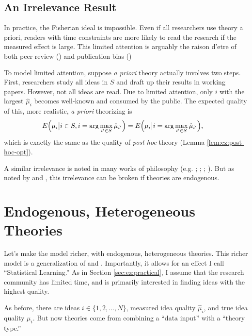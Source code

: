 \documentclass[12pt,english]{article}
\theoremstyle{plain}
\theoremstyle{plain}
\begin{document}
\subsection{An Irrelevance Result}\label{sec:ez:irr}

In practice, the Fisherian ideal is impossible. Even if all researchers use theory a priori, readers with time constraints are more likely to read the research if the measured effect is large.  This limited attention is arguably the raison d'etre of both peer review (\citet{klamer2002attention}) and publication bias (\citet{chen2022publication})

To model limited attention, suppose \emph{a priori} theory actually involves two steps. First, researchers study all ideas in $S$ and draft up their results in working papers. However, not all ideas are read.  Due to limited attention, only $i$ with the largest $\hat{\mu}_{i}$ becomes well-known and consumed by the public. The expected quality of this, more realistic, \emph{a priori} theorizing is
\begin{align}
E\Bigl(\mu_{i}\big|i\in S ,i=\arg\max_{i'\in S }\hat{\mu}_{i'}\Bigr) 
& =
E\Bigl(\mu_{i}\big|i=\arg\max_{i'\in S }\hat{\mu}_{i'}\Bigr),
\end{align}
which is exactly the same as the quality of \emph{post hoc} theory (Lemma \ref{lem:ez:post-hoc-opt}).

A similar irrelevance is noted in many works of philosophy (e.g. \citet{hempel1966philosophy}; \citet{lakatos1970methodology}; \citet{rosenkrantz1977inference}; \citet{gardner1982predicting}).  But as noted by \citet{maher1988prediction} and \citet{kahn1996positive}, this irrelevance can be broken if theories are endogenous.

\section{Endogenous, Heterogeneous Theories}\label{sec:het}

Let's make the model richer, with endogenous, heterogeneous theories. This richer model is a generalization of \citet{maher1988prediction} and \citet{kahn1996positive}. Importantly, it allows for an effect I call ``Statistical Learning.'' As in Section \ref{sec:ez:practical}, I assume that the research community has limited time, and is primarily interested in finding ideas with the highest quality.

As before, there are ideas $i\in \{1,2,...,N\}$, measured idea quality $\hat{\mu}_{i}$, and true idea quality $\mu_{i}$. But now  theories come from combining a ``data input'' with a ``theory type.''  
\end{document}
